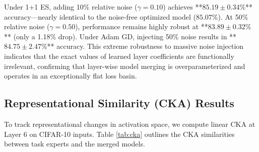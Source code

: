 Under 1+1 ES, adding 10\% relative noise ($\gamma = 0.10$) achieves **$85.19 \pm 0.34\%$** accuracy—nearly identical to the noise-free optimized model ($85.07\%$). At 50\% relative noise ($\gamma = 0.50$), performance remains highly robust at **$83.89 \pm 0.32\%$** (only a 1.18\% drop). Under Adam GD, injecting 50\% noise results in **$84.75 \pm 2.47\%$** accuracy. This extreme robustness to massive noise injection indicates that the exact values of learned layer coefficients are functionally irrelevant, confirming that layer-wise model merging is overparameterized and operates in an exceptionally flat loss basin.

\subsection{Representational Similarity (CKA) Results}
To track representational changes in activation space, we compute linear CKA at Layer 6 on CIFAR-10 inputs. Table \ref{tab:cka} outlines the CKA similarities between task experts and the merged models.

\begin{table}[t]
\caption{Linear CKA similarity (Mean $\pm$ Std Dev \%) at Layer 6 on CIFAR-10 inputs across 3 seeds. While Spatially Averaged models exhibit marginally higher CKA values, the differences are statistically tiny (within standard deviation) and decoupling is observed as they do not translate to downstream classification accuracy.}
\label{tab:cka}
\centering
{}
\end{table}

